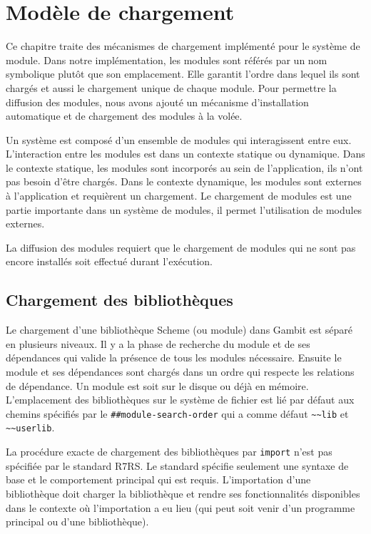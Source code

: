 
\chapter{Modèle de chargement}
\label{ch:loading-model}

Ce chapitre traite des mécanismes de chargement implémenté pour le système de
module.  Dans notre implémentation, les modules sont référés par un nom symbolique
plutôt que son emplacement. Elle garantit l'ordre dans lequel ils sont chargés
et aussi le chargement unique de chaque module. Pour permettre la diffusion des
modules, nous avons ajouté un mécanisme d'installation automatique et de
chargement des modules à la volée.

Un système est composé d'un ensemble de modules qui interagissent
entre eux. L'interaction entre les modules est dans un contexte statique ou
dynamique. Dans le contexte statique, les modules sont incorporés au sein de
l'application, ils n'ont pas besoin d'être chargés. Dans le contexte dynamique,
les modules sont externes à l'application et requièrent un chargement.
Le chargement de modules est une partie importante dans un système de modules,
il permet l'utilisation de modules externes.

La diffusion des modules requiert que le chargement de modules qui ne sont
pas encore installés soit effectué durant l'exécution.

\section{Chargement des bibliothèques}


Le chargement d'une bibliothèque Scheme (ou module) dans Gambit est séparé en
plusieurs niveaux. Il y a la phase de recherche du module et de ses dépendances
qui valide la présence de tous les modules nécessaire.  Ensuite le module et
ses dépendances sont chargés dans un ordre qui respecte les relations de
dépendance.  Un module est soit sur le disque ou déjà en mémoire.
L'emplacement des bibliothèques sur le système de fichier est lié par défaut
aux chemins spécifiés par le \lstinline{##module-search-order} qui a comme défaut
\lstinline{~~lib} et \lstinline{~~userlib}.

La procédure exacte de chargement des bibliothèques par \texttt{import} n'est pas
spécifiée par le standard R7RS. Le standard spécifie seulement une syntaxe de
base et le comportement principal qui est requis. L'importation d'une
bibliothèque doit charger la bibliothèque et rendre ses fonctionnalités
disponibles dans le contexte où l'importation a eu lieu (qui peut soit venir d'un
programme principal ou d'une bibliothèque).

